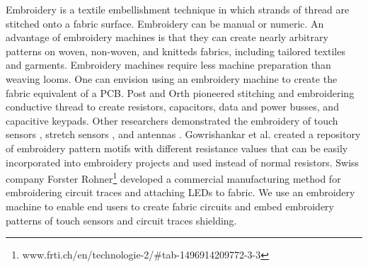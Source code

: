 Embroidery is a textile  embellishment technique in which strands of thread are stitched onto a fabric surface. Embroidery can be manual or numeric. An advantage of embroidery machines is that they can create nearly arbitrary patterns on woven, non-woven, and knitteds fabrics, including tailored textiles and garments. Embroidery machines require less machine preparation than weaving looms.
One can envision using an embroidery machine to create the fabric equivalent of a PCB. 
Post and Orth \cite{5387040} pioneered stitching and embroidering conductive thread to create resistors, capacitors, data and power busses, and capacitive keypads. 
Other researchers demonstrated the embroidery of touch sensors \cite{zeagler2012textile, roh2014textile,hamdan2016grabbing}, stretch sensors \cite{vogl2017stretcheband}, and antennas \cite{brechet2017cost}. Gowrishankar et al. \cite{Gowrishankar:2013:PRE:2493988.2494341} created a repository of embroidery pattern motifs
with different resistance values that can be easily incorporated into embroidery projects and used instead of normal resistors. Swiss company Forster Rohner\footnote{www.frti.ch/en/technologie-2/#tab-1496914209772-3-3}
developed a commercial manufacturing method for embroidering circuit traces and attaching LEDs to fabric. 
We use an embroidery machine to enable end users to create fabric circuits and embed embroidery patterns of touch sensors and circuit traces shielding.






